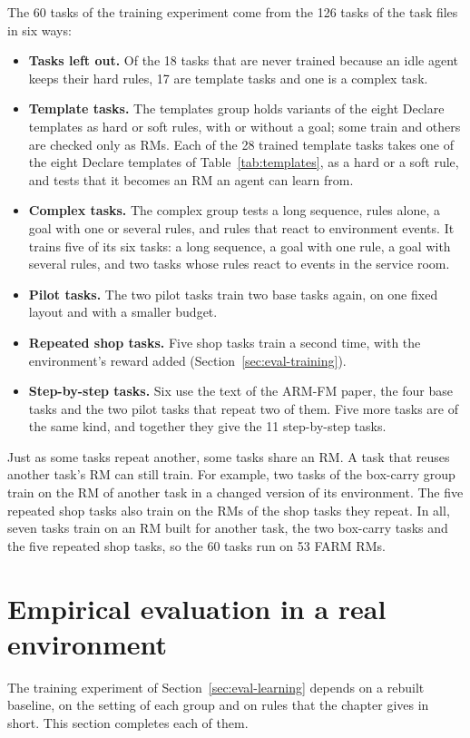 \documentclass[11pt,english,listoffigures,listoftables]{tfgetsinf}
\begin{document}
The 60 tasks of the training experiment come from the 126 tasks of the task files in six ways:
\begin{itemize}
    \item \textbf{Tasks left out.} Of the 18 tasks that are never trained because an idle agent keeps their hard rules, 17 are template tasks and one is a complex task.
    \item \textbf{Template tasks.} The templates group holds variants of the eight Declare templates as hard or soft rules, with or without a goal; some train and others are checked only as RMs. Each of the 28 trained template tasks takes one of the eight Declare templates of Table~\ref{tab:templates}, as a hard or a soft rule, and tests that it becomes an RM an agent can learn from.
    \item \textbf{Complex tasks.} The complex group tests a long sequence, rules alone, a goal with one or several rules, and rules that react to environment events. It trains five of its six tasks: a long sequence, a goal with one rule, a goal with several rules, and two tasks whose rules react to events in the service room.
    \item \textbf{Pilot tasks.} The two pilot tasks train two base tasks again, on one fixed layout and with a smaller budget.
    \item \textbf{Repeated shop tasks.} Five shop tasks train a second time, with the environment's reward added (Section~\ref{sec:eval-training}).
    \item \textbf{Step-by-step tasks.} Six use the text of the ARM-FM paper, the four base tasks and the two pilot tasks that repeat two of them. Five more tasks are of the same kind, and together they give the 11 step-by-step tasks.
\end{itemize}

\noindent Just as some tasks repeat another, some tasks share an RM. A task that reuses another task's RM can still train. For example, two tasks of the box-carry group train on the RM of another task in a changed version of its environment. The five repeated shop tasks also train on the RMs of the shop tasks they repeat. In all, seven tasks train on an RM built for another task, the two box-carry tasks and the five repeated shop tasks, so the 60 tasks run on 53 FARM RMs.

\section{Empirical evaluation in a real environment}
\label{app:eval-learning}
The training experiment of Section~\ref{sec:eval-learning} depends on a rebuilt baseline, on the setting of each group and on rules that the chapter gives in short. This section completes each of them.
\end{document}
